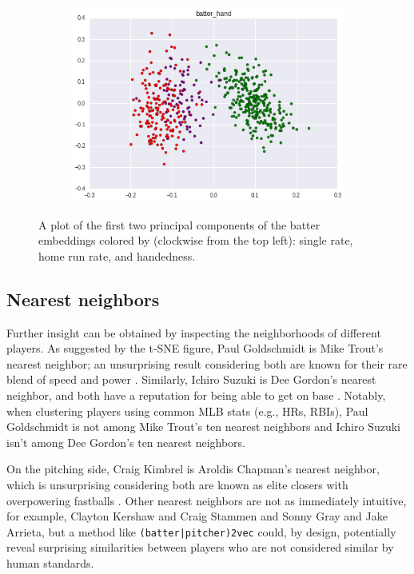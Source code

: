 \documentclass{article}
\begin{document}
\begin{figure}
    \begin{subfigure}{0.5\linewidth}
    \centering
    \includegraphics[width=1\linewidth]{batter_hand.png}
    \caption{}
    \end{subfigure}
\caption{A plot of the first two principal components of the batter embeddings colored by (clockwise from the top left): single rate, home run rate, and handedness.}
\label{fig:batter_traits}
\end{figure}

\subsection{Nearest neighbors}

Further insight can be obtained by inspecting the neighborhoods of different players. As suggested by the t-SNE figure, Paul Goldschmidt is Mike Trout's nearest neighbor; an unsurprising result considering both are known for their rare blend of speed and power \parencite{Kory2015}. Similarly, Ichiro Suzuki is Dee Gordon's nearest neighbor, and both have a reputation for being able to get on base \parencite{Sullivan2015}. Notably, when clustering players using common MLB stats (e.g., HRs, RBIs), Paul Goldschmidt is not among Mike Trout's ten nearest neighbors and Ichiro Suzuki isn't among Dee Gordon's ten nearest neighbors.

On the pitching side, Craig Kimbrel is Aroldis Chapman's nearest neighbor, which is unsurprising considering both are known as elite closers with overpowering fastballs \parencite{Mirsky2016}. Other nearest neighbors are not as immediately intuitive, for example, Clayton Kershaw and Craig Stammen and Sonny Gray and Jake Arrieta, but a method like \texttt{(batter|pitcher)2vec} could, by design, potentially reveal surprising similarities between players who are not considered similar by human standards.
\end{document}
